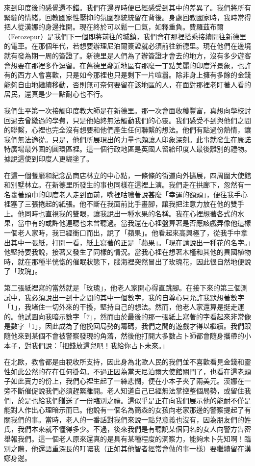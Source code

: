 來到印度後的感覺還不錯。我們在邊界時便已經感受到其中的差異了。我們將所有緊繃的情緒，回教國家性壓抑的氛圍都統統留在背後。身處回教國家時，我時常得把人從漢娜的身邊推開。現在終於可以鬆一口氣，如釋重負。費羅茲布爾（Ferozepur）是我們下一個即將前往的城鎮，我們會在那裡搭乘接續開往新德里的電車。在那個年代，若想要辦理尼泊爾簽證就必須前往新德里。現在他們在邊境就有發為期一周的簽證了。新德里是人們為了辦簽證才會去的地方，沒有多少遊客會想要在那裡多作逗留。在舊德里鄰近地區有那麼一丁點美麗的印度洋景象，也許有的西方人會喜歡，只是如今那裡也只是剩下一片喧囂。除非身上擁有多餘的金錢能夠自由地繼續移動，否則無可奈何要留在該地區的人，在面對那裡老盯著人看的居民，還真是少一點耐心也不行。

我們生平第一次接觸印度教大師是在新德里。那一次會面收穫豐富，真想向學校討回過去曾繳過的學費，只是他始終無法觸動我們的心靈。我們感受不到與他們之間的聯繫，心裡也完全沒有想要和他們產生任何聯繫的想法。他們有點過份熱情，讓我們無法適從。只是，他們所展現出的力量也頗讓人印象深刻。此事就發生在康諾特廣場最外圍的圓環區裡。這一個行政地區是英國人留給印度人最後離別的禮物。據說這使到印度人更糊塗了。

在這一個餐廳和紀念品商店林立的中心點，一條條的街道向外擴展，四周圍大使館和別墅林立。在新德里所發生的事也同樣在這裡上演。我們走在拱廊下，忽然有一名裹著頭巾的印度老人走到面前，嘴裡咕噥著說甚麼「幸運的額頭」，便往我手心裡塞了三張捲起的紙張。他不斷在我面前比手畫腳，讓我把注意力放在他的雙手上。他同時也直視我的雙眼，讓我說出一種水果的名稱。我在心裡想著各式的水果，當中有的或許他連聽也未曾聽過。當我還在心裡盤算著是否應該戲弄像他這樣一個老人家時，我已經衝口而出，說了「蘋果」。他看起來高興極了，從我手中拿出其中一張紙，打開一看，紙上寫著的正是「蘋果」。「現在請說出一種花的名字。」他堅持要我說，接著又發生了同樣的情況。當我心裡在想著木槿和其他的異國植物時，就在那種半恍惚的催眠狀態下，腦海裡突然冒出了玫瑰花，因此很自然地便說了「玫瑰」。

第二張紙裡寫的當然就是「玫瑰」，他老人家開心得直跳腳。在接下來的第三個測試中，我必須說出一到十之間的其中一個數字，我的自尊心只允許我默想著數字「1」，我堵住一切外來的干擾，堅持自己的想法。然而，他老人家還算是挺走運的。他試圖向我暗示數字「7」，然而由於最後的那一張紙上寫著的字看起來非常像是數字「1」，因此成為了他挽回局勢的籌碼，我們之間的遊戲才得以繼續。我們跟隨他來到某個不會被警察發現的角落，然後他打開大多數占卜師都會隨身攜帶的小本子，對我們說：「把錢放這兒吧！我給你占卜未來。」


在北歐，教會都是由稅收所支持，因此身為北歐人民的我們並不喜歡看見金錢和靈性如此公然的存在任何掛勾。不過正因為當天尼泊爾大使館關門了，也看在這老頭子如此賣力的份上，我們心裡生起了一絲悲憫，便在小本子夾了兩美元。漢娜在一旁不斷催促說我們必須趕緊離開。老人知道自己已經無法掌控整個局勢，或留住我們，於是也給我們贈送了一份臨別之禮。這似乎是正在向我們展示他的能耐不僅是能對人作出心理暗示而已。他說有一個名為簡森的女孩向老家那邊的警察提起了有關我們的事。當時，老人的一番話對我們來說一點兒意義也沒有，因為朋友們的姓氏，我們本來就不懂得多少。不過，後來我們是有聽說某個同名的女人向警方告密舉報我們。這一個老人原來還真的是具有某種程度的洞察力，能夠未卜先知啊！臨別之際，他還語重深長的叮囑我（正如其他智者經常會做的事一樣）要繼續留在漢娜身邊。

